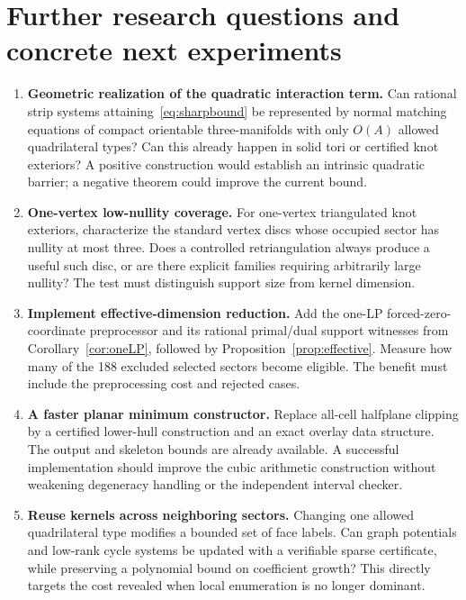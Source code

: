 \documentclass[11pt,letterpaper]{article}
\theoremstyle{definition}
\theoremstyle{remark}\newtheorem{remark}[theorem]{Remark}
\begin{document}
\clearpage
\section{Further research questions and concrete next experiments}
\label{sec:future}

\begin{enumerate}[label=\textbf{\arabic*.},leftmargin=*]
\item \textbf{Geometric realization of the quadratic interaction term.}
Can rational strip systems attaining~\eqref{eq:sharpbound} be represented
by normal matching equations of compact orientable three-manifolds with
only $O(A)$ allowed quadrilateral types? Can this already happen in solid
tori or certified knot exteriors? A positive construction would establish
an intrinsic quadratic barrier; a negative theorem could improve the
current bound.

\item \textbf{One-vertex low-nullity coverage.}
For one-vertex triangulated knot exteriors, characterize the standard
vertex discs whose occupied sector has nullity at most three. Does a
controlled retriangulation always produce a useful such disc, or are
there explicit families requiring arbitrarily large nullity? The test
must distinguish support size from kernel dimension.

\item \textbf{Implement effective-dimension reduction.}
Add the one-LP forced-zero-coordinate preprocessor and its rational
primal/dual support witnesses from Corollary~\ref{cor:oneLP}, followed by
Proposition~\ref{prop:effective}.
Measure how many of the 188 excluded selected sectors become eligible.
The benefit must include the preprocessing cost and rejected cases.

\item \textbf{A faster planar minimum constructor.}
Replace all-cell halfplane clipping by a certified lower-hull construction
and an exact overlay data structure. The output and skeleton bounds are
already available. A successful implementation should improve the cubic
arithmetic construction without weakening degeneracy handling or the
independent interval checker.

\item \textbf{Reuse kernels across neighboring sectors.}
Changing one allowed quadrilateral type modifies a bounded set of face
labels. Can graph potentials and low-rank cycle systems be updated with
a verifiable sparse certificate, while preserving a polynomial bound on
coefficient growth? This directly targets the cost revealed when local
enumeration is no longer dominant.


\end{enumerate}
\end{document}
